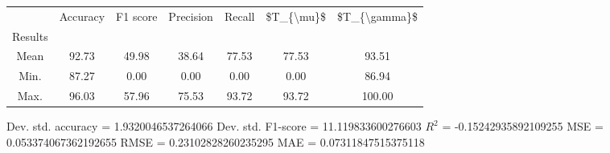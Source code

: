 \begin{tabular}{|c|c|c|c|c|c|c|}
\toprule
{} &  Accuracy &  F1 score &  Precision &  Recall &  \$T\_\{\textbackslash mu\}\$ &  \$T\_\{\textbackslash gamma\}\$ \\
Results &           &           &            &         &            &               \\
\hline
Mean    &     92.73 &     49.98 &      38.64 &   77.53 &      77.53 &         93.51 \\
Min.    &     87.27 &      0.00 &       0.00 &    0.00 &       0.00 &         86.94 \\
Max.    &     96.03 &     57.96 &      75.53 &   93.72 &      93.72 &        100.00 \\
\bottomrule
\end{tabular}

 Dev. std. accuracy = 1.9320046537264066
 Dev. std. F1-score = 11.119833600276603
 $R^2$ = -0.15242935892109255
 MSE = 0.053374067362192655
 RMSE = 0.23102828260235295
 MAE = 0.07311847515375118